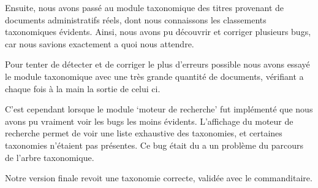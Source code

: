 Ensuite, nous avons passé au module taxonomique des titres provenant de documents administratifs réels, dont nous connaissons les classements taxonomiques évidents.
Ainsi, nous avons pu découvrir et corriger plusieurs bugs, car nous savions exactement a quoi nous attendre.

Pour tenter de détecter et de corriger le plus d'erreurs possible nous avons essayé le module taxonomique avec une très grande quantité de documents, vérifiant a chaque fois à la main la sortie de celui ci. 

C'est cependant lorsque le module `moteur de recherche' fut implémenté que nous avons pu vraiment voir les bugs les moins évidents.
L'affichage du moteur de recherche permet de voir une liste exhaustive des taxonomies, et certaines taxonomies n'étaient pas présentes.
Ce bug était du a un problème du parcours de l'arbre taxonomique.


Notre version finale revoit une taxonomie correcte, validée avec le commanditaire.




